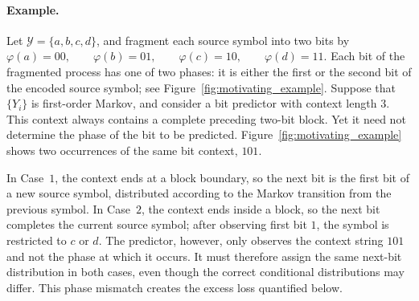\documentclass{article}
\theoremstyle{plain}
\theoremstyle{definition}
\theoremstyle{remark}
\begin{document}
    \paragraph{Example.}
    Let $\mathcal{Y}=\{a,b,c,d\}$, and fragment each source symbol into two
    bits by
    $
        \varphi(a)=00,\qquad
        \varphi(b)=01,\qquad
        \varphi(c)=10,\qquad
        \varphi(d)=11 .
    $
    Each bit of the fragmented process has one of two phases: it is either
    the first or the second bit of the encoded source symbol; see
    Figure~\ref{fig:motivating_example}. Suppose that $\{Y_i\}$ is first-order Markov, and consider a bit predictor
    with context length $3$.  This context always contains a complete
    preceding two-bit block.  Yet it need not determine the phase of the bit
    to be predicted.  Figure~\ref{fig:motivating_example} shows two
    occurrences of the same bit context, $101$.
    
    
    In Case~$1$, the context ends at a block boundary, so the next bit is the
first bit of a new source symbol, distributed according to the Markov transition
from the previous symbol. In Case~$2$, the context ends inside a block, so the
next bit completes the current source symbol; after observing first bit $1$, the
symbol is restricted to $c$ or $d$. The predictor, however, only observes the context string $101$ and not the
phase at which it occurs. It must therefore assign the same next-bit
distribution in both cases, even though the correct conditional distributions
may differ. This phase mismatch creates the excess loss quantified below.
    
\end{document}
